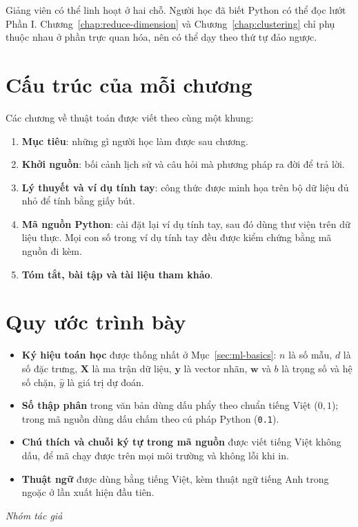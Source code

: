 Giảng viên có thể linh hoạt ở hai chỗ. Người học đã biết Python có thể đọc lướt Phần I. Chương~\ref{chap:reduce-dimension} và Chương~\ref{chap:clustering} chỉ phụ thuộc nhau ở phần trực quan hóa, nên có thể dạy theo thứ tự đảo ngược.

\section*{Cấu trúc của mỗi chương}

Các chương về thuật toán được viết theo cùng một khung:
\begin{enumerate}
    \item \textbf{Mục tiêu}: những gì người học làm được sau chương.
    \item \textbf{Khởi nguồn}: bối cảnh lịch sử và câu hỏi mà phương pháp ra đời để trả lời.
    \item \textbf{Lý thuyết và ví dụ tính tay}: công thức được minh họa trên bộ dữ liệu đủ nhỏ để tính bằng giấy bút.
    \item \textbf{Mã nguồn Python}: cài đặt lại ví dụ tính tay, sau đó dùng thư viện trên dữ liệu thực. Mọi con số trong ví dụ tính tay đều được kiểm chứng bằng mã nguồn đi kèm.
    \item \textbf{Tóm tắt, bài tập và tài liệu tham khảo}.
\end{enumerate}

\section*{Quy ước trình bày}

\begin{itemize}
    \item \textbf{Ký hiệu toán học} được thống nhất ở Mục~\ref{sec:ml-basics}: $n$ là số mẫu, $d$ là số đặc trưng, $\mathbf{X}$ là ma trận dữ liệu, $\mathbf{y}$ là vector nhãn, $\mathbf{w}$ và $b$ là trọng số và hệ số chặn, $\hat{y}$ là giá trị dự đoán.
    \item \textbf{Số thập phân} trong văn bản dùng dấu phẩy theo chuẩn tiếng Việt ($0{,}1$); trong mã nguồn dùng dấu chấm theo cú pháp Python (\texttt{0.1}).
    \item \textbf{Chú thích và chuỗi ký tự trong mã nguồn} được viết tiếng Việt không dấu, để mã chạy được trên mọi môi trường và không lỗi khi in.
    \item \textbf{Thuật ngữ} được dùng bằng tiếng Việt, kèm thuật ngữ tiếng Anh trong ngoặc ở lần xuất hiện đầu tiên.
\end{itemize}

\vspace{1em}
\begin{flushright}
\textit{Nhóm tác giả}
\end{flushright}
